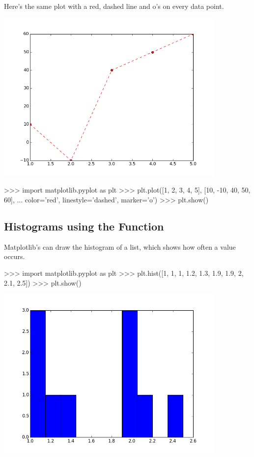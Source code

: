 \documentclass[11pt]{cselabheader}
\begin{document}
Here's the same plot with a red, dashed line and o's on every data point.

\begin{center}
\includegraphics[width=0.85\textwidth]{img/matplotlib_plot2.png}
\end{center}

\begin{pyconcode}
>>> import matplotlib.pyplot as plt
>>> plt.plot([1, 2, 3, 4, 5], [10, -10, 40, 50, 60],
...          color='red', linestyle='dashed', marker='o')
>>> plt.show()
\end{pyconcode}

\subsection{Histograms using the 
Function}

Matplotlib's  can draw the histogram of a
list, which shows how often a value occurs.

\begin{pyconcode}
>>> import matplotlib.pyplot as plt
>>> plt.hist([1, 1, 1, 1.2, 1.3, 1.9, 1.9, 2, 2.1, 2.5])
>>> plt.show()
\end{pyconcode}

\begin{center}
\includegraphics[width=0.85\textwidth]{img/matplotlib_hist1.png}
\end{center}
\end{document}

